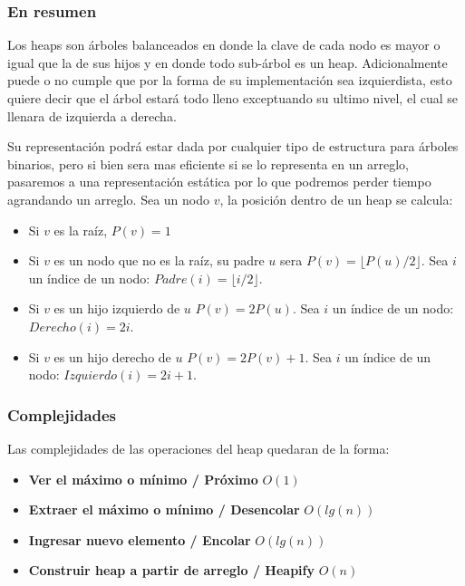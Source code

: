 
\subsubsection{En resumen}

Los heaps son \'arboles balanceados en donde la clave de cada nodo es mayor o igual que la de sus hijos y en donde todo sub-\'arbol es un heap. Adicionalmente puede o no cumple que por la forma de su implementaci\'on sea izquierdista, esto quiere decir que el \'arbol estar\'a todo lleno exceptuando su ultimo nivel, el cual se llenara de izquierda a derecha.

Su representaci\'on podr\'a estar dada por cualquier tipo de estructura para \'arboles binarios, pero si bien sera mas eficiente si se lo representa en un arreglo, pasaremos a una representaci\'on est\'atica por lo que podremos perder tiempo agrandando un arreglo. Sea un nodo $v$, la posici\'on dentro de un heap se calcula:

\begin{itemize}
 \item Si $v$ es la ra\'iz, $P(v) = 1$
 \item Si $v$ es un nodo que no es la ra\'iz, su padre $u$ sera $P(v) = \lfloor P(u)/2\rfloor$. Sea $i$ un \'indice de un nodo: $Padre(i) = \lfloor i/2\rfloor$.
 \item Si $v$ es un hijo izquierdo de $u$ $P(v) = 2P(u)$. Sea $i$ un \'indice de un nodo: $Derecho(i) = 2i$.
 \item Si $v$ es un hijo derecho de $u$ $P(v) = 2P(v)+1$. Sea $i$ un \'indice de un nodo: $Izquierdo(i) = 2i+1$.
\end{itemize}

\subsubsection{Complejidades}
Las complejidades de las operaciones del heap quedaran de la forma:

\begin{itemize}
 \item \textbf{Ver el m\'aximo o m\'inimo / Pr\'oximo} $O(1)$
 \item \textbf{Extraer el m\'aximo o m\'inimo / Desencolar} $O(lg(n))$
 \item \textbf{Ingresar nuevo elemento / Encolar} $O(lg(n))$
 \item \textbf{Construir heap a partir de arreglo / Heapify} $O(n)$
\end{itemize}

